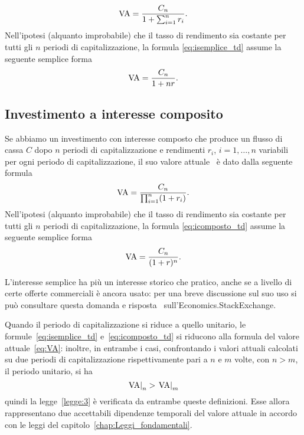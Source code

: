 \begin{equation}
  \label{eq:isemplice_td}
  \mathrm{VA}=\frac{C_n}{1+\sum_{i=1}^nr_i}.
\end{equation}
Nell'ipotesi (alquanto improbabile) che il tasso di rendimento sia costante per tutti gli $n$ periodi di capitalizzazione,
la formula \eqref{eq:isemplice_td} assume la seguente semplice forma
\[
  \mathrm{VA}=\frac{C_n}{1+nr}.
\]

\subsection{Investimento a interesse composito}
\label{sec:icomposto_td}

Se abbiamo un investimento con interesse composto che produce un flusso di cassa $C$ dopo $n$ periodi di capitalizzazione
e rendimenti $r_i$, $i= 1, \ldots, n$ variabili per ogni periodo di capitalizzazione, il suo valore attuale \VA\ è dato dalla
seguente formula
\begin{equation}
  \label{eq:icomposto_td}
  \mathrm{VA}=\frac{C_n}{\prod_{i=1}^n(1+r_i)}.
\end{equation}
Nell'ipotesi  (alquanto improbabile) che il tasso di rendimento sia costante per tutti gli $n$ periodi di capitalizzazione,
la formula \eqref{eq:icomposto_td} assume la seguente semplice forma
\[
  \mathrm{VA}=\frac{C_n}{(1+r)^n}.
\]

\begin{oss}\label{oss:isemplice}
  L'interesse semplice ha più un interesse storico che pratico, anche se a livello di certe offerte
  commerciali è ancora usato: per una breve discussione sul suo uso si può consultare questa domanda
  e risposta~\cite{Romanchuk2021} sull'Economics.StackExchange.
\end{oss}

\begin{oss}
  Quando il periodo di capitalizzazione si riduce a quello unitario, le formule~\eqref{eq:isemplice_td} e~\eqref{eq:icomposto_td}
  si riducono alla formula del valore attuale~\eqref{eq:VA}: inoltre, in entrambe i casi, confrontando i valori attuali
  calcolati su due periodi di capitalizzazione rispettivamente pari a $n$ e $m$ volte, con $n>m$, il periodo unitario, si ha
  \[
    \left.\mathrm{VA}\right|_{n}> \left.\mathrm{VA}\right|_{m}
  \]
  quindi la legge~\ref{legge:3} è verificata da entrambe queste definizioni. Esse allora rappresentano due accettabili
  dipendenze temporali del valore attuale in accordo con le leggi del capitolo~\ref{chap:Leggi_fondamentali}. 
\end{oss}


